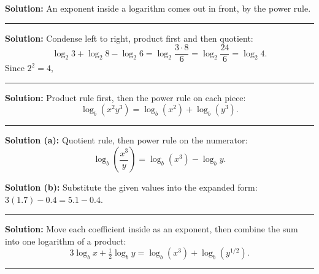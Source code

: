 \documentclass[12pt]{article}
\begin{document}
\textbf{Solution:} An exponent inside a logarithm comes out in front, by the
power rule. 

\vspace{0.2cm}\noindent\rule{\linewidth}{0.2pt}\vspace{0.2cm}


\textbf{Solution:} Condense left to right, product first and then quotient:
\[ \log_2 3 + \log_2 8 - \log_2 6 = \log_2\!\frac{3 \cdot 8}{6}
   = \log_2\!\frac{24}{6} = \log_2 4 . \]
Since $2^2 = 4$, 

\vspace{0.2cm}\noindent\rule{\linewidth}{0.2pt}\vspace{0.2cm}


\textbf{Solution:} Product rule first, then the power rule on each piece:
\[ \log_b\!\left(x^2 y^3\right) = \log_b\!\left(x^2\right) + \log_b\!\left(y^3\right) . \]

\vspace{0.2cm}\noindent\rule{\linewidth}{0.2pt}\vspace{0.2cm}


\textbf{Solution (a):} Quotient rule, then power rule on the numerator:
\[ \log_b\!\left(\frac{x^3}{y}\right) = \log_b\!\left(x^3\right) - \log_b y . \]

\textbf{Solution (b):} Substitute the given values into the expanded form:
$3(1.7) - 0.4 = 5.1 - 0.4$. 

\vspace{0.2cm}\noindent\rule{\linewidth}{0.2pt}\vspace{0.2cm}


\textbf{Solution:} Move each coefficient inside as an exponent, then combine the
sum into one logarithm of a product:
\[ 3\log_b x + \tfrac{1}{2}\log_b y = \log_b\!\left(x^3\right) + \log_b\!\left(y^{1/2}\right) . \]

\vspace{0.2cm}\noindent\rule{\linewidth}{0.2pt}\vspace{0.2cm}
\end{document}
